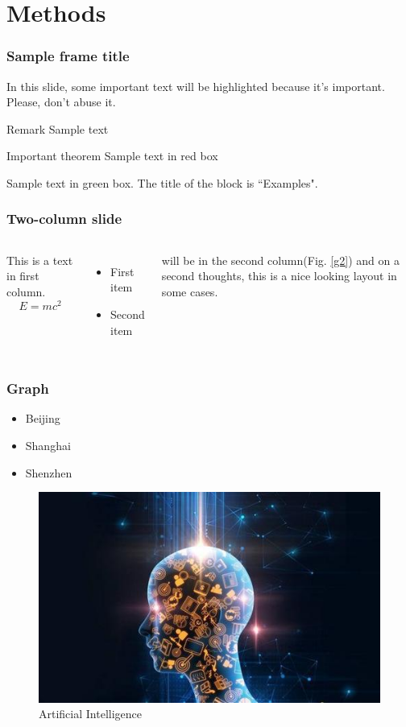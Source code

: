 \documentclass[10pt]{beamer}
\begin{document}
	\section{Methods}
	\begin{frame}
		\frametitle{Sample frame title}
		
		In this slide, some important text will be
		\alert{highlighted} because it's important.
		Please, don't abuse it.
		
		\begin{block}{Remark}
			Sample text
		\end{block}
		
		\begin{alertblock}{Important theorem}
			Sample text in red box
		\end{alertblock}
		
		\begin{examples}
			Sample text in green box. The title of the block is ``Examples".
		\end{examples}
	\end{frame}
	\begin{frame}
		\frametitle{Two-column slide}
		\begin{columns}
			\column{0.5\textwidth}
			This is a text in first column.
			$$E=mc^2$$
			\begin{itemize}
				\item First item
				\item Second item
			\end{itemize}
			
			\column{0.5\textwidth}
			{\small \textcite{kamilaris2018deep} will be in the second column(Fig. \ref{g2})
			and on a second thoughts\parencite{deng2014deep}, this is a nice looking
			layout in some cases\parencite{deng2014deep,kamilaris2018deep,mackenzie1992risk}.}
		\end{columns}
	\end{frame}
	\begin{frame}
		\frametitle{Graph}
		\begin{itemize}
			\item Beijing
			\item Shanghai
			\item Shenzhen
		\end{itemize}
		\begin{figure}[]
			\centering
			\includegraphics[scale=0.4]{img/g1}
			\caption{Artificial Intelligence}
		\end{figure}
	\end{frame}
\end{document}
